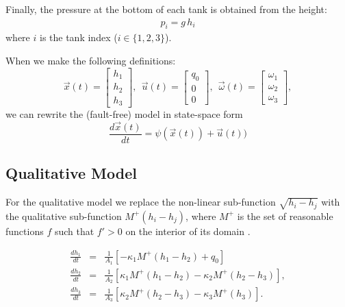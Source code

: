 Finally, the pressure at the bottom of each tank is obtained from the height:
\begin{eqnarray}\label{eq:pressure}
p_i = g\,h_i  
\end{eqnarray}
where $i$ is the tank index ($i \in \{1, 2, 3\}$).

When we make the following definitions:
\begin{equation}
\vec{x}(t) = \left[ \begin{array}{c}
h_1 \\ h_2 \\ h_3 \end{array}
\right],
~~ \vec{u}(t)  = \left[ \begin{array}{c}
q_0 \\ 0 \\ 0 \end{array}
\right],
~~ \vec{\omega}(t) = \left[ \begin{array}{c}
\omega_1 \\ \omega_2 \\ \omega_3 \end{array}
\right],
\end{equation}
we can rewrite the (fault-free) model in state-space form
\begin{equation}\label{state-space}
\frac{d \vec{x}(t)}{dt} = \psi (\vec{x}(t)) + \vec{u}(t)) 
\end{equation}




\subsection{Qualitative Model}

For the qualitative model we replace the non-linear sub-function
$ \sqrt{h_i - h_j}$ with the qualitative sub-function $M^+(h_i - h_j)$,
where $M^+$ is the set of reasonable functions $f$ such that $f' > 0$ on the interior of its domain \citep{kuipers1994composition}.

\begin{eqnarray}
\frac{d h_1}{dt} & = & \frac{1}{A_1}\left[  - \kappa_1  M^+(h_1 - h_2) + q_0 \right]    \label{eq:qual-ode1} \\
\frac{d h_2}{dt} &  = & \frac{1}{A_2}\left[   \kappa_{1} M^+(h_{1}-h_{2}) - \kappa_2 M^+(h_2-h_3)\right],\\
\frac{d h_3}{dt} & = & \frac{1}{A_3}\left[   \kappa_{2} M^+(h_2-h_3) - \kappa_3 M^+(h_3)\right].
\end{eqnarray}

